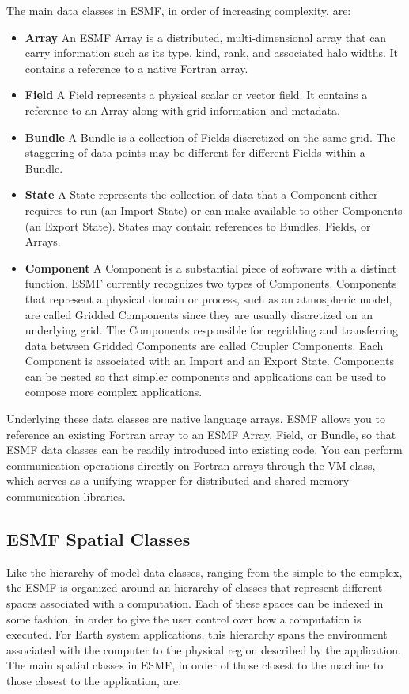The main data classes in ESMF, in order of increasing complexity, are:
\begin{itemize}
\item {\bf Array} An ESMF Array is a distributed, multi-dimensional 
array that can carry information such as its type, kind, rank, and 
associated halo widths.  It contains a reference to a native Fortran array.
\item {\bf Field}  A Field represents a physical scalar or vector field.
It contains a reference to an Array along with grid information and metadata.
\item {\bf Bundle}  A Bundle is a collection of Fields discretized 
on the same grid.  The staggering of data points may be different for 
different Fields within a Bundle.
\item {\bf State}  A State represents the collection of data that a 
Component either requires to run (an Import State) or can make 
available to other Components (an Export State).
States may contain references to Bundles, Fields, or Arrays. 
\item {\bf Component}  A Component is a substantial piece of software 
with a distinct function.  ESMF currently recognizes two types 
of Components.  Components that represent a physical domain 
or process, such 
as an atmospheric model, are called Gridded Components since they are 
usually discretized on an underlying grid.  The Components 
responsible for regridding and transferring data between Gridded 
Components are called Coupler Components.  Each Component
is associated with an Import and an Export State.  Components
can be nested so that simpler components and applications can 
be used to compose more complex applications.

\end{itemize}

Underlying these data classes are native language arrays.  ESMF allows 
you to reference an existing Fortran array to an ESMF Array, 
Field, or Bundle, so that ESMF data classes can be readily 
introduced into existing code.  You can perform communication operations 
directly on Fortran arrays through the VM class, which serves 
as a unifying wrapper for distributed and shared memory communication 
libraries.

\subsection{ESMF Spatial Classes}

Like the hierarchy of model data classes, ranging from the 
simple to the complex, the ESMF is organized around an hierarchy of 
classes that represent different spaces associated with a computation.
Each of these spaces can be indexed in some fashion, in order to give
the user control over how a computation is executed.  For Earth system
applications, this hierarchy spans the environment associated with the 
computer to the physical region described by the application.  
The main spatial classes in ESMF, in order of those closest to the
machine to those closest to the application, are:

